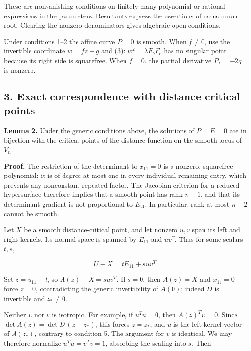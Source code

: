 \documentclass[10pt,a4paper]{article}
\begin{document}
These are nonvanishing conditions on finitely many polynomial or
rational expressions in the parameters. Resultants express the
assertions of no common root. Clearing the nonzero denominators gives
algebraic open conditions.

Under conditions 1--2 the affine curve \(P=0\) is smooth. When
\(f\ne0\), use the invertible coordinate \(w=fz+g\) and (3):
\(w^2=\lambda F_bF_c\) has no singular point because its right side is
squarefree. When \(f=0\), the partial derivative \(P_z=-2g\) is nonzero.


\subsection{3. Exact correspondence with distance critical
points}\label{exact-correspondence-with-distance-critical-points}

\textbf{Lemma 2.} Under the generic conditions above, the solutions of
\(P=E=0\) are in bijection with the critical points of the distance
function on the smooth locus of \(V_n\).

\textbf{Proof.} The restriction of the determinant to \(x_{11}=0\) is a
nonzero, squarefree polynomial: it is of degree at most one in every
individual remaining entry, which prevents any nonconstant repeated
factor. The Jacobian criterion for a reduced hypersurface therefore
implies that a smooth point has rank \(n-1\), and that its determinant
gradient is not proportional to \(E_{11}\). In particular, rank at most
\(n-2\) cannot be smooth.

Let \(X\) be a smooth distance-critical point, and let nonzero \(u,v\)
span its left and right kernels. Its normal space is spanned by
\(E_{11}\) and \(uv^T\). Thus for some scalars \(t,s\),

\nopagebreak[4]

\[U-X=tE_{11}+suv^T.\]

Set \(z=u_{11}-t\), so \(A(z)-X=suv^T\). If \(s=0\), then \(A(z)=X\) and
\(x_{11}=0\) force \(z=0\), contradicting the generic invertibility of
\(A(0)\); indeed \(D\) is invertible and \(z_*\ne0\).

Neither \(u\) nor \(v\) is isotropic. For example, if \(u^Tu=0\), then
\(A(z)^Tu=0\). Since \(\det A(z)=\det D\,(z-z_*)\), this forces
\(z=z_*\), and \(u\) is the left kernel vector of \(A(z_*)\), contrary
to condition 5. The argument for \(v\) is identical. We may therefore
normalize \(u^Tu=v^Tv=1\), absorbing the scaling into \(s\). Then
\end{document}

